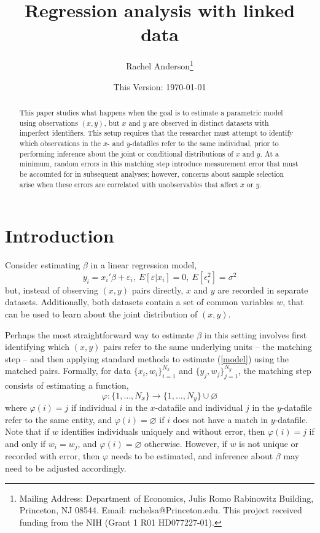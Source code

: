\documentclass[12pt]{article}
\title{\singlespacing Regression analysis with linked data}
\author{Rachel Anderson\thanks{Mailing Address: Department of Economics, Julis Romo Rabinowitz Building,
Princeton, NJ 08544. Email: rachelsa@Princeton.edu.
This project received funding from the NIH (Grant 1 R01 HD077227-01). }}
\date{This Version: \today}
\begin{document}
\maketitle


\begin{abstract}
\singlespacing
\noindent This paper studies what happens when the goal is to estimate a parametric model using observations $(x,y)$, but $x$ and $y$ are observed in distinct datasets with imperfect identifiers.  This setup requires that the researcher must attempt to identify which observations in the $x$- and $y$-datafiles refer to the same individual, prior to performing inference about the joint or conditional distributions of $x$ and $y$.  At a minimum, random errors in this matching step introduce measurement error that must be accounted for in subsequent analyses; however, concerns about sample selection arise when these errors are correlated with unobservables that affect $x$ or $y$.  \end{abstract}


\section{Introduction}

Consider estimating $\beta$ in a linear regression model, \begin{equation} y_i = x_i'\beta + \varepsilon_i, \ E[\varepsilon | x_i] = 0, \ E[\epsilon_i^2] = \sigma^2  \label{model} \end{equation}
but, instead of observing $(x, y)$ pairs directly,  $x$ and $y$ are recorded in separate datasets.  Additionally, both datasets contain a set of common variables $w$, that can be used to learn about the joint distribution of $(x,y)$.

Perhaps the most straightforward way to estimate $\beta$ in this setting involves first identifying which $(x,y)$ pairs refer to the same underlying units -- the matching step -- and then applying standard methods to estimate (\ref{model}) using the matched pairs.   Formally, for data $\{x_i, w_i\}_{i=1}^{N_x}$ and $\{y_j, w_j\}_{j=1}^{N_y}$, the matching step consists of estimating a function, \begin{equation} \varphi: \{1,\dots, N_x\} \to \{1,\dots, N_y\} \cup \varnothing \end{equation} where $\varphi(i) = j$ if individual $i$ in the $x$-datafile and individual $j$ in the $y$-datafile refer to the same entity, and $\varphi(i) = \varnothing$ if $i$ does not have a match in $y$-datafile.  Note that if $w$ identifies individuals uniquely and without error, then $\varphi(i) = j$ if and only if $w_i = w_j$, and $\varphi(i) = \varnothing$ otherwise.  However, if $w$ is not unique or recorded with error, then $\varphi$ needs to be estimated, and inference about $\beta$ may need to be adjusted accordingly.   
\end{document}
